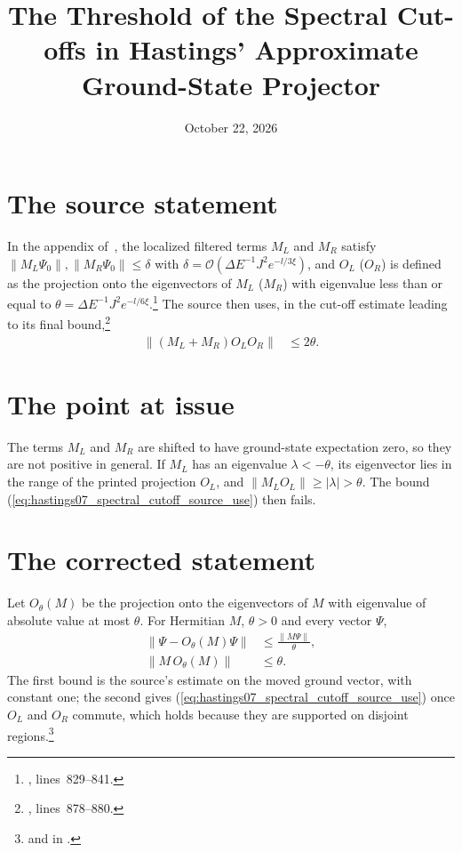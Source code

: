 \documentclass{article}
\title{The Threshold of the Spectral Cut-offs in Hastings' Approximate Ground-State Projector}
\author{}
\date{October 22, 2026}
\begin{document}
\maketitle
{}

\section{The source statement}

In the appendix of~\cite{Hastings2007AreaLaw}, the localized filtered terms
$M_L$ and $M_R$ satisfy $\lVert M_L\Psi_0\rVert,\lVert M_R\Psi_0\rVert\le
    \delta$ with $\delta=\mathcal O(\Delta E^{-1}J^2e^{-l/3\xi})$, and $O_L$
($O_R$) is defined as the projection onto the eigenvectors of $M_L$ ($M_R$)
with eigenvalue less than or equal to
$\theta=\Delta E^{-1}J^2e^{-l/6\xi}$.\footnote{,
    lines~829--841.}
The source then uses, in the cut-off estimate leading to its final
bound,\footnote{, lines~878--880.}
\begin{align}
    \lVert(M_L+M_R)O_LO_R\rVert
     & \le 2\theta.
    \label{eq:hastings07_spectral_cutoff_source_use}
\end{align}

\section{The point at issue}

The terms $M_L$ and $M_R$ are shifted to have ground-state expectation zero,
so they are not positive in general. If $M_L$ has an eigenvalue $\lambda<
    -\theta$, its eigenvector lies in the range of the printed projection $O_L$,
and $\lVert M_LO_L\rVert\ge\lvert\lambda\rvert>\theta$. The bound
(\ref{eq:hastings07_spectral_cutoff_source_use}) then fails.

\section{The corrected statement}

Let $O_\theta(M)$ be the projection onto the eigenvectors of $M$ with
eigenvalue of absolute value at most $\theta$. For Hermitian $M$, $\theta>0$
and every vector $\Psi$,
\begin{align}
    \lVert\Psi-O_\theta(M)\Psi\rVert
     & \le\frac{\lVert M\Psi\rVert}{\theta},
    \label{eq:hastings07_spectral_cutoff_obd}
    \\
    \lVert M\,O_\theta(M)\rVert
     & \le\theta.
    \label{eq:hastings07_spectral_cutoff_norm}
\end{align}
The first bound is the source's estimate on the moved ground vector, with
constant one; the second gives
(\ref{eq:hastings07_spectral_cutoff_source_use}) once $O_L$ and $O_R$
commute, which holds because they are supported on disjoint
regions.\footnote{
    and  in
    .}
\end{document}
